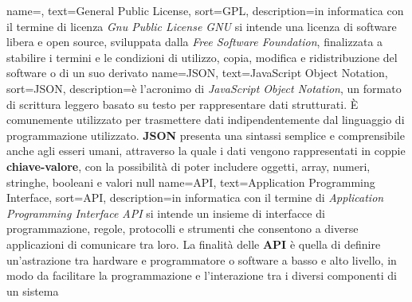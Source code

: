      {
        name=,
        text=General Public License,
        sort=GPL,
        description={in informatica con il termine di licenza \textit{Gnu Public License GNU} si intende  
        una licenza di software libera e open source, sviluppata dalla \textit{Free Software Foundation}, finalizzata a stabilire i termini e le condizioni 
        di utilizzo, copia, modifica e ridistribuzione del software o di un suo derivato}
    }
    {
        name={JSON},
        text=JavaScript Object Notation,
        sort=JSON,
        description={è l'acronimo di \textit{JavaScript Object Notation}, un formato di scrittura leggero basato su testo per rappresentare dati strutturati. 
        È comunemente utilizzato per trasmettere dati indipendentemente dal linguaggio di programmazione utilizzato. \textbf{JSON} presenta una sintassi semplice e comprensibile anche agli 
        esseri umani, attraverso la quale i dati vengono rappresentati in coppie \textbf{chiave-valore}, con la possibilità di poter includere 
        oggetti, array, numeri, stringhe, booleani e valori null}
    }
{
    name={API},
    text=Application Programming Interface,
    sort=API,
    description={in informatica con il termine di \textit{Application Programming Interface API} si intende un insieme di interfacce di 
    programmazione, regole, protocolli e strumenti che consentono a diverse applicazioni di comunicare tra loro. La finalità delle 
    \textbf{API} è quella di definire un'astrazione tra hardware e programmatore o software a basso e alto livello, in modo da facilitare
    la programmazione e l'interazione tra i diversi componenti di un sistema}
}
